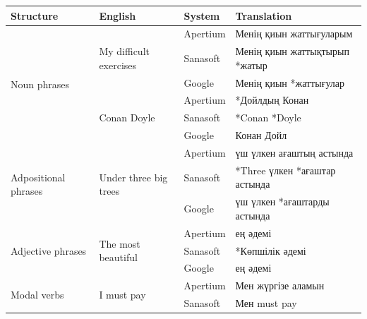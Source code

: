 \documentclass[11pt]{article}
\begin{document}
\begin{table}
  \centering
  \begin{tabular}{|l|l|l|l|}
    \hline 
    \textbf{Structure} & \textbf{English} & \textbf{System} & \textbf{Translation} \\
    \hline 
    \multirow{6}{*}{Noun phrases} & \multirow{3}{*}{My difficult exercises} & Apertium & Менің қиын жаттығуларым \\
                                  &                                         & Sanasoft & Менің қиын жаттықтырып *жатыр \\ %
                                  &                                         & Google   & Менің қиын *жаттығулар \\ %
                                  & \multirow{3}{*}{Conan Doyle}            & Apertium & *Дойлдың Конан \\
                                  &                                         & Sanasoft & *Conan *Doyle \\ %
                                  &                                         & Google   & Конан Дойл \\ %
    \hline 
    \multirow{3}{*}{Adpositional phrases}  & \multirow{3}{*}{Under three big trees}  & Apertium & үш үлкен ағаштың астында \\
                                           &                                         & Sanasoft & *Three үлкен *ағаштар астында \\ %
                                           &                                         & Google   & үш үлкен *ағаштарды астында \\ %
    \hline 
    \multirow{3}{*}{Adjective phrases}    & \multirow{3}{*}{The most beautiful}      & Apertium & ең әдемі \\ 
                                          &                                          & Sanasoft & *Көпшілік әдемі \\ %
                                          &                                          & Google   & ең әдемі \\
    \hline
    \multirow{6}{*}{Modal verbs}  & \multirow{3}{*}{I must pay}             & Apertium & Мен жүргізе аламын \\
                                  &                                         & Sanasoft & Мен must pay \\ %

\end{tabular}
\end{table}
\end{document}
